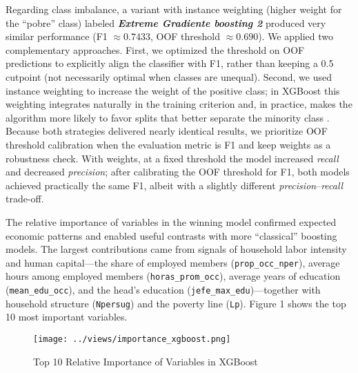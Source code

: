 \documentclass[12pt,a4paper,onecolumn]{article}
\begin{document}
Regarding class imbalance, a variant with instance weighting (higher weight for the ``pobre'' class) labeled \textbf{\textit{Extreme Gradiente boosting 2}} produced very similar performance (F1 $\approx 0.7433$, OOF threshold $\approx 0.690$). We applied two complementary approaches. First, we optimized the threshold on OOF predictions to explicitly align the classifier with F1, rather than keeping a 0.5 cutpoint (not necessarily optimal when classes are unequal). Second, we used instance weighting to increase the weight of the positive class; in XGBoost this weighting integrates naturally in the training criterion and, in practice, makes the algorithm more likely to favor splits that better separate the minority class \citep{ChenGuestrin2016}. Because both strategies delivered nearly identical results, we prioritize OOF threshold calibration when the evaluation metric is F1 and keep weights as a robustness check. With weights, at a fixed threshold the model increased \textit{recall} and decreased \textit{precision}; after calibrating the OOF threshold for F1, both models achieved practically the same F1, albeit with a slightly different \textit{precision}--\textit{recall} trade-off.



The relative importance of variables in the winning model confirmed expected economic patterns and enabled useful contrasts with more ``classical'' boosting models. The largest contributions came from signals of household labor intensity and human capital---the share of employed members (\texttt{prop\_occ\_nper}), average hours among employed members (\texttt{horas\_prom\_occ}), average years of education (\texttt{mean\_edu\_occ}), and the head’s education (\texttt{jefe\_max\_edu})---together with household structure (\texttt{Npersug}) and the poverty line (\texttt{Lp}). Figure 1 shows the top 10 most important variables.


\begin{figure}
    \centering
    \texttt{[image: ../views/importance\_xgboost.png]}
    \caption{Top 10 Relative Importance of Variables in XGBoost}
    \label{fig:placeholder}
\end{figure}
\end{document}
